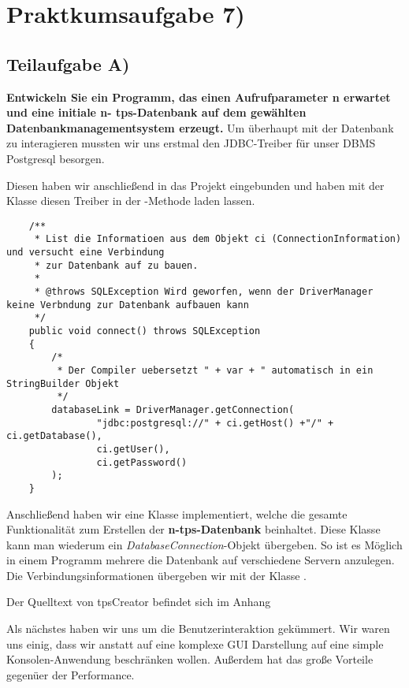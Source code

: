 \section{Praktkumsaufgabe 7)}
\subsection{Teilaufgabe A)}
\textbf{Entwickeln Sie ein Programm, das einen Aufrufparameter n erwartet und eine initiale n-
tps-Datenbank auf dem gewählten Datenbankmanagementsystem erzeugt.}
Um überhaupt mit der Datenbank zu interagieren mussten wir uns erstmal den
JDBC-Treiber für unser DBMS Postgresql besorgen.

Diesen haben wir anschließend in das Projekt eingebunden und haben mit der
Klasse  diesen Treiber in der
-Methode laden lassen.


\begin{lstlisting}
	/**
	 * List die Informatioen aus dem Objekt ci (ConnectionInformation) und versucht eine Verbindung 
	 * zur Datenbank auf zu bauen.
	 * 
	 * @throws SQLException Wird geworfen, wenn der DriverManager keine Verbndung zur Datenbank aufbauen kann
	 */
	public void connect() throws SQLException
	{
		/*
		 * Der Compiler uebersetzt " + var + " automatisch in ein StringBuilder Objekt
		 */
		databaseLink = DriverManager.getConnection(
				"jdbc:postgresql://" + ci.getHost() +"/" + ci.getDatabase(),
				ci.getUser(), 
				ci.getPassword()
		);
	}
\end{lstlisting}


Anschließend haben wir eine Klasse  implementiert, welche die
gesamte Funktionalität zum Erstellen der \textbf{n-tps-Datenbank} beinhaltet.
Diese Klasse kann man wiederum ein \textit{DatabaseConnection}-Objekt übergeben.
So ist es Möglich in einem Programm mehrere die Datenbank auf verschiedene
Servern anzulegen. Die Verbindungsinformationen übergeben wir mit der Klasse
.

Der Quelltext von tpsCreator befindet sich im Anhang~

Als nächstes haben wir uns um die Benutzerinteraktion gekümmert. Wir waren uns
einig, dass wir anstatt auf eine komplexe GUI Darstellung auf eine simple
Konsolen-Anwendung beschränken wollen. Außerdem hat das große Vorteile gegenüer
der Performance.

